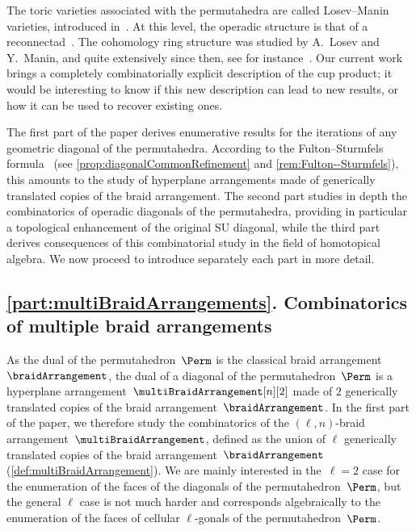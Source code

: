\documentclass{amsart}
\theoremstyle{definition}
\newcommand{\SU}{\mathrm{SU}}
\begin{document}
The toric varieties associated with the permutahedra are called Losev--Manin varieties, introduced in~\cite{LosevManin}.
At this level, the operadic structure is that of a reconnectad~\cite{DotsenkoKeilthyLyskov}. 
The cohomology ring structure was studied by A.~Losev and Y.~Manin, and quite extensively since then, see for instance~\cite{BergstromMinabe, Lin}. 
Our current work brings a completely combinatorially explicit description of the cup product; it would be interesting to know if this new description can lead to new results, or how it can be used to recover existing ones.

The first part of the paper derives enumerative results for the iterations of any geometric diagonal of the permutahedra. 
According to the Fulton--Sturmfels formula~\cite{FultonSturmfels} (see \cref{prop:diagonalCommonRefinement} and \cref{rem:Fulton--Sturmfels}), this amounts to the study of hyperplane arrangements made of generically translated copies of the braid arrangement.
The second part studies in depth the combinatorics of operadic diagonals of the permutahedra, providing in particular a topological enhancement of the original $\SU$ diagonal, while the third part derives consequences of this combinatorial study in the field of homotopical algebra.
We now proceed to introduce separately each part in more detail.


\subsection*{\cref{part:multiBraidArrangements}. Combinatorics of multiple braid arrangements}

As the dual of the permutahedron~$\Perm$ is the classical braid arrangement~$\braidArrangement$, the dual of a diagonal of the permutahedron~$\Perm$ is a hyperplane arrangement~$\multiBraidArrangement[n][2]$ made of $2$ generically translated copies of the braid arrangement~$\braidArrangement$.
In the first part of the paper, we therefore study the combinatorics of the $(\ell,n)$-braid arrangement~$\multiBraidArrangement$, defined as the union of $\ell$ generically translated copies of the braid arrangement~$\braidArrangement$ (\cref{def:multiBraidArrangement}).
We are mainly interested in the~$\ell = 2$ case for the enumeration of the faces of the diagonals of the permutahedron~$\Perm$, but the general $\ell$ case is not much harder and corresponds algebraically to the enumeration of the faces of cellular $\ell$-gonals of the permutahedron~$\Perm$.
\end{document}
